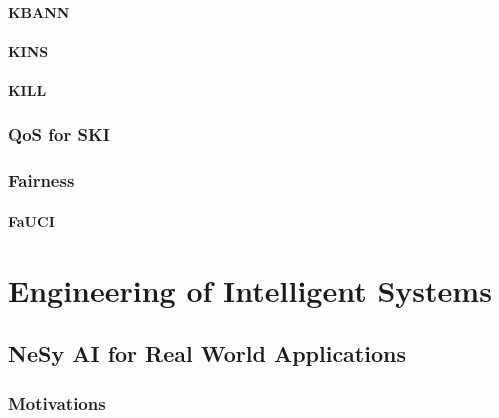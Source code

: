 \documentclass[12pt,a4paper,openright,twoside]{book}
\begin{document}
\subsection{\Acl{KBANN}}\label{subsec:kbann}

\subsection{\Acl{KINS}}\label{subsec:kins}

\subsection{\Acl{KILL}}\label{subsec:kill}

\section{\Acl{QoS} for \ac{SKI}}\label{sec:qos}

\section{Fairness}\label{sec:fairness}

\subsection{\Acl{FaUCI}}\label{subsec:fauci}


\part{Engineering of Intelligent Systems}\label{part:engineering-of-intelligent-systems}


\chapter{\Ac{NeSy} \ac{AI} for Real World Applications}\label{ch:nesy-ai-for-real-world-applications}

\section{Motivations}\label{sec:nesy-ai-motivations}
\end{document}
